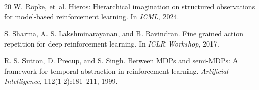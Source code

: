 \documentclass[letterpaper]{article}
\begin{document}
\begin{thebibliography}{20}
W. R{\"o}pke, et~al.
\newblock Hieros: Hierarchical imagination on structured observations for model-based reinforcement learning.
\newblock In \emph{ICML}, 2024.

S. Sharma, A. S. Lakshminarayanan, and B. Ravindran.
\newblock Fine grained action repetition for deep reinforcement learning.
\newblock In \emph{ICLR Workshop}, 2017.

R. S. Sutton, D. Precup, and S. Singh.
\newblock Between {MDPs} and semi-{MDPs}: A framework for temporal abstraction in reinforcement learning.
\newblock \emph{Artificial Intelligence}, 112(1-2):181--211, 1999.

\end{thebibliography}
\end{document}
